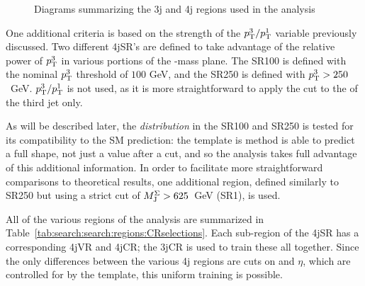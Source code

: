 \begin{figure}[!ht]
  \centering
    \caption{Diagrams summarizing the 3j and 4j regions used in the analysis}
  \label{fig:search:search:regions}
\end{figure}

One additional criteria is based on the strength of the $p_{\text{T}}^3/p_{\text{T}}^1$ variable previously discussed. Two different 4jSR's are defined to take advantage of the relative power of $p_{\text{T}}^3$ in various portions of the \gluino-\lsp mass plane. The SR100 is defined with the nominal $p_{\text{T}}^3$ threshold of $100$ GeV, and the SR250 is defined with $p_{\text{T}}^3 > 250$~GeV. $p_{\text{T}}^3/p_{\text{T}}^1$ is not used, as it is more straightforward to apply the cut to the \pt of the third jet only. 

As will be described later, the \MJ \textit{distribution} in the SR100 and SR250 is tested for its compatibility to the SM prediction: the template is method is able to predict a full shape, not just a value after a cut, and so the analysis takes full advantage of this additional information. In order to facilitate more straightforward comparisons to theoretical results, one additional region, defined similarly to SR250 but using a strict cut of $M_{\textrm{J}}^{\Sigma} > 625$~GeV (SR1), is used. 

All of the various regions of the analysis are summarized in Table~\ref{tab:search:search:regions:CRselections}. Each sub-region of the 4jSR has a corresponding 4jVR and 4jCR; the 3jCR is used to train these all together. Since the only differences between the various 4j regions are cuts on \pt and $\eta$, which are controlled for by the template, this uniform training is possible.

